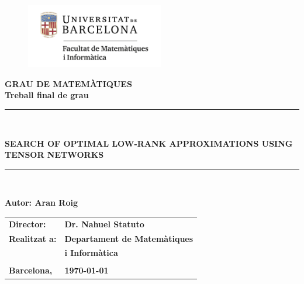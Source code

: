 \documentclass[11pt,a4paper,openright,oneside]{book}
\numberwithin{equation}{section}
\begin{document}



\thispagestyle{empty}

\begin{titlepage}
\begin{center}
\begin{figure}[htb]
\begin{center}
\includegraphics[width=6cm]{matematiquesinformatica-pos-rgb.png}
\end{center}
\end{figure}

\vspace*{1cm}
\textbf{\LARGE GRAU DE MATEM\`{A}TIQUES } \\
\vspace*{.5cm}
\textbf{\LARGE Treball final de grau} \\

\vspace*{1.5cm}
\rule{16cm}{0.1mm}\\
\begin{Huge}
\textbf{SEARCH OF OPTIMAL LOW-RANK APPROXIMATIONS USING TENSOR NETWORKS} \\
\end{Huge}
\rule{16cm}{0.1mm}\\

\vspace{1cm}

\begin{flushright}
\textbf{\LARGE Autor: Aran Roig}

\vspace*{2cm}

\renewcommand{\arraystretch}{1.5}
\begin{tabular}{ll}
\textbf{\Large Director:} & \textbf{\Large Dr. Nahuel Statuto} \\
\textbf{\Large Realitzat a:} & \textbf{\Large  Departament de Matemàtiques   } \\
 & \textbf{\Large i Informàtica} \\
\\
\textbf{\Large Barcelona,} & \textbf{\Large \today }
\end{tabular}

\end{flushright}

\end{center}



\end{titlepage}
\end{document}
